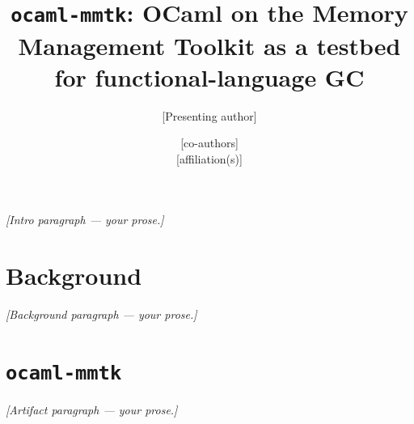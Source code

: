 \documentclass[11pt,a4paper]{article}
\title{\vspace{-2.5em}\texttt{ocaml-mmtk}: OCaml on the Memory Management Toolkit
       as a testbed for functional-language GC}
\author{[Presenting author] \and [co-authors] \\[2pt]
        \small [affiliation(s)]}
\date{}
\begin{document}
\maketitle
\thispagestyle{empty}

\textit{[Intro paragraph — your prose.]}

\section*{Background}
\textit{[Background paragraph — your prose.]}

\section*{\texttt{ocaml-mmtk}}
\textit{[Artifact paragraph — your prose.]}
\end{document}
